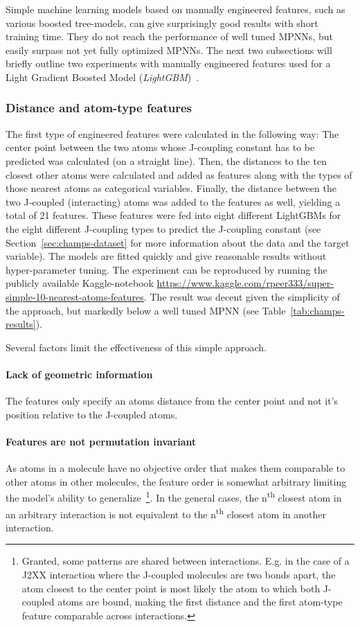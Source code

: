 Simple machine learning models based on manually engineered features, such as various boosted tree-models, can give surprisingly good results with short training time. They do not reach the performance of well tuned MPNNs, but easily surpass not yet fully optimized MPNNs. The next two subsections will briefly outline two experiments with manually engineered features used for a Light Gradient Boosted Model (\textit{LightGBM})~\cite{Ke2017}.


\subsubsection{Distance and atom-type features}
\label{sec:dist-atom-type}

The first type of engineered features were calculated in the following way: The center point between the two atoms whose J-coupling constant has to be predicted was calculated (on a straight line). Then, the distances to the ten closest other atoms were calculated and added as features along with the types of those nearest atoms as categorical variables. Finally, the distance between the two J-coupled (interacting) atoms was added to the features as well, yielding a total of 21 features. These features were fed into eight different LightGBMs
for the eight different J-coupling types to predict the J-coupling constant (see Section~\ref{sec:champs-dataset} for more information about the data and the target variable). The models are fitted quickly and give reasonable results without hyper-parameter tuning. The experiment can be reproduced by running the publicly available Kaggle-notebook \url{https://www.kaggle.com/rpeer333/super-simple-10-nearest-atoms-features}. The result was decent given the simplicity of the approach, but markedly below a well tuned MPNN (see Table~\ref{tab:champs-results}).

\noindent Several factors limit the effectiveness of this simple approach.

\paragraph*{Lack of geometric information} The features only specify an atoms distance from the center point and not it's position relative to the J-coupled atoms.

\paragraph*{Features are not permutation invariant} As atoms in a molecule have no objective order that makes them comparable to other atoms in other molecules, the feature order is somewhat arbitrary limiting the model's ability to generalize~\footnote{
	Granted, some patterns are shared between interactions. E.g. in the case of a J2XX interaction where the J-coupled molecules are two bonds apart, the atom closest to the center point is most likely the atom to which both J-coupled atoms are bound, making the first distance and the first atom-type feature comparable across interactions.
}. In the general cases, the n\textsuperscript{th} closest atom in an arbitrary interaction is not equivalent to the n\textsuperscript{th} closest atom in another interaction.


